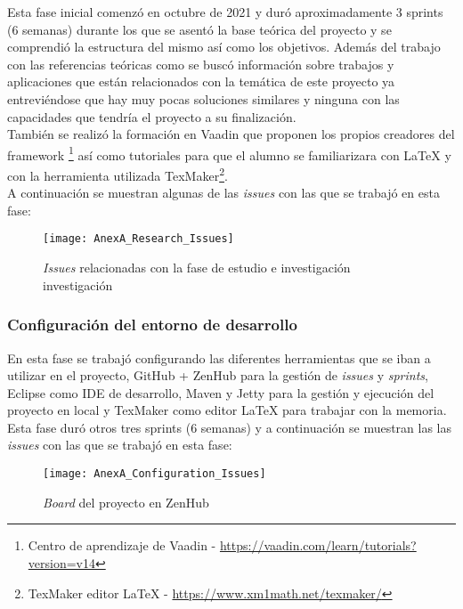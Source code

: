 Esta fase inicial comenzó en octubre de 2021 y duró aproximadamente 3 sprints (6 semanas) durante los que se asentó la base teórica del proyecto y se comprendió la estructura del mismo así como los objetivos. Además del trabajo con las referencias teóricas como \cite{ratzinger_space:_2007} se buscó información sobre trabajos y aplicaciones que están relacionados con la temática de este proyecto ya entreviéndose que hay muy pocas soluciones similares y ninguna con las capacidades que tendría el proyecto a su finalización.\\
También se realizó la formación en Vaadin que proponen los propios creadores del framework \footnote{Centro de aprendizaje de Vaadin - \url{https://vaadin.com/learn/tutorials?version=v14}} así como tutoriales para que el alumno se familiarizara con LaTeX y con la herramienta utilizada TexMaker\footnote{TexMaker editor LaTeX - \url{https://www.xm1math.net/texmaker/}}.\\

A continuación se muestran algunas de las \textit{issues} con las que se trabajó en esta fase:

\begin{figure}[!h]
	\centering
	\texttt{[image: AnexA\_Research\_Issues]}
	\caption{\textit{Issues} relacionadas con la fase de estudio e investigación investigación}
	\label{fig:AnexA_Research_Issues}
\end{figure}
\FloatBarrier

\subsubsection{Configuración del entorno de desarrollo}

En esta fase se trabajó configurando las diferentes herramientas que se iban a utilizar en el proyecto, GitHub + ZenHub para la gestión de \textit{issues} y \textit{sprints}, Eclipse como IDE de desarrollo, Maven y Jetty para la gestión y ejecución del proyecto en local y TexMaker como editor LaTeX para trabajar con la memoria. Esta fase duró otros tres sprints (6 semanas) y a continuación se muestran las las \textit{issues} con las que se trabajó en esta fase:

\begin{figure}[!h]
	\centering
	\texttt{[image: AnexA\_Configuration\_Issues]}
	\caption{\textit{Board} del proyecto en ZenHub}
	\label{fig:AnexA_Configuration_Issues}
\end{figure}
\FloatBarrier

